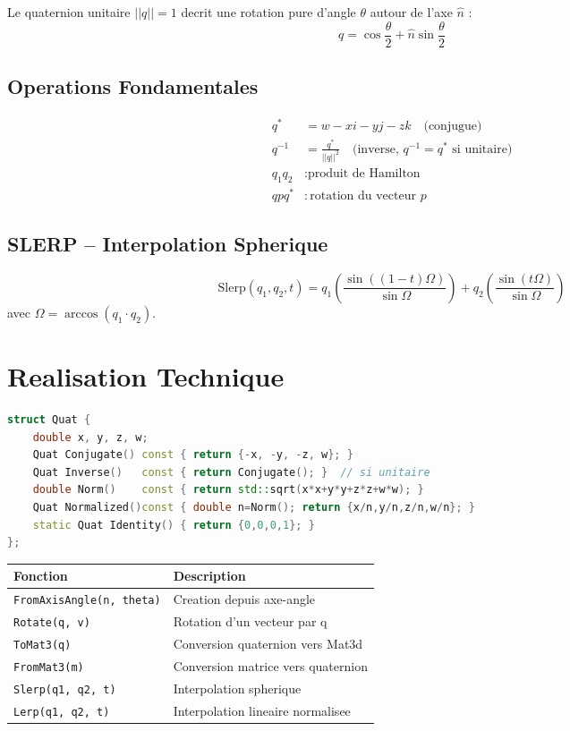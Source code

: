 \documentclass[12pt,a4paper]{article}
\begin{document}
Le quaternion unitaire $||q||=1$ decrit une rotation pure d'angle $\theta$ autour de l'axe $\hat{n}$ :
\[
    q = \cos\frac{\theta}{2} + \hat{n}\sin\frac{\theta}{2}
\]

\subsection{Operations Fondamentales}

\begin{align}
    q^* &= w - xi - yj - zk \quad \text{(conjugue)} \\
    q^{-1} &= \frac{q^*}{||q||^2} \quad \text{(inverse, } q^{-1}=q^* \text{ si unitaire)} \\
    q_1 q_2 &: \text{produit de Hamilton} \\
    q p q^* &: \text{rotation du vecteur } p
\end{align}

\subsection{SLERP -- Interpolation Spherique}

\[
    \text{Slerp}(q_1, q_2, t) = q_1 \left(\frac{\sin((1-t)\Omega)}{\sin\Omega}\right)
    + q_2 \left(\frac{\sin(t\Omega)}{\sin\Omega}\right)
\]
avec $\Omega = \arccos(q_1 \cdot q_2)$.

\section{Realisation Technique}

\begin{lstlisting}[language=C++, caption=Structure Quat]
struct Quat {
    double x, y, z, w;
    Quat Conjugate() const { return {-x, -y, -z, w}; }
    Quat Inverse()   const { return Conjugate(); }  // si unitaire
    double Norm()    const { return std::sqrt(x*x+y*y+z*z+w*w); }
    Quat Normalized()const { double n=Norm(); return {x/n,y/n,z/n,w/n}; }
    static Quat Identity() { return {0,0,0,1}; }
};
\end{lstlisting}

\begin{center}
\begin{tabular}{ll}
    \toprule
    \textbf{Fonction} & \textbf{Description} \\
    \midrule
    \texttt{FromAxisAngle(n, theta)} & Creation depuis axe-angle \\
    \texttt{Rotate(q, v)} & Rotation d'un vecteur par q \\
    \texttt{ToMat3(q)} & Conversion quaternion vers Mat3d \\
    \texttt{FromMat3(m)} & Conversion matrice vers quaternion \\
    \texttt{Slerp(q1, q2, t)} & Interpolation spherique \\
    \texttt{Lerp(q1, q2, t)} & Interpolation lineaire normalisee \\
    \bottomrule
\end{tabular}
\end{center}
\end{document}
